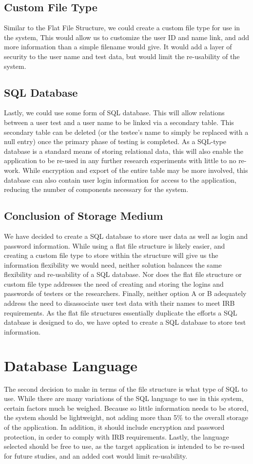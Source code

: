 \documentclass[onecolumn, draftclsnofoot,10pt, compsoc]{report}
\begin{document}
\subsection{Custom File Type}
Similar to the Flat File Structure, we could create a custom file type for use in the system, This would allow us to customize the user ID and name link, and add more information than a simple filename would give. It would add a layer of security to the user name and test data, but would limit the re-usability of the system. 
\subsection{SQL Database}
Lastly, we could use some form of SQL database. This will allow relations between a user test and a user name to be linked via a secondary table. This secondary table can be deleted (or the testee's name to simply be replaced with a null entry) once the primary phase of testing is completed. As a SQL-type database is a standard means of storing relational data, this will also enable the application to be re-used in any further research experiments with little to no re-work. While encryption and export of the entire table may be more involved, this database can also contain user login information for access to the application, reducing the number of components necessary for the system.
\subsection{Conclusion of Storage Medium}
We have decided to create a SQL database to store user data as well as login and password information. While using a flat file structure is likely easier, and creating a custom file type to store within the structure will give us the information flexibility we would need, neither solution balances the same flexibility and re-usability of a SQL database. Nor does the flat file structure or custom file type addresses the need of creating and storing the logins and passwords of testers or the researchers. Finally, neither option A or B adequately address the need to disassociate user test data with their names to meet IRB requirements. As the flat file structures essentially duplicate the efforts a SQL database is designed to do, we have opted to create a SQL database to store test information.

\section{Database Language}
The second decision to make in terms of the file structure is what type of SQL to use. While there are many variations of the SQL language to use in this system, certain factors much be weighed. Because so little information needs to be stored, the system should be lightweight, not adding more than 5\% to the overall storage of the application. In addition, it should include encryption and password protection, in order to comply with IRB requirements. Lastly, the language selected should be free to use, as the target application is intended to be re-used for future studies, and an added cost would limit re-usability.
\end{document}
